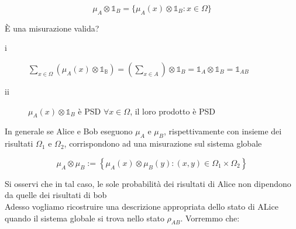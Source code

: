 \documentclass{report}
\begin{document}
$$
    \mu_A\otimes\mathbb{1}_B=\{\mu_A(x)\otimes\mathbb{1}_B:x\in\Omega\}
$$

È una misurazione valida?
\begin{description}
    \item[i]    $\sum_{x\in\Omega}(\mu_A(x)\otimes\mathbb{1_B})=\left(\sum_{x\in A}\right)\otimes\mathbb{1}_B =\mathbb{1}_A\otimes\mathbb{1}_B=\mathbb{1}_{AB}$
    \item[ii]   $\mu_A(x)\otimes\mathbb{1}_B$ è PSD $\forall x \in \Omega$, il loro prodotto è PSD
\end{description}

In generale se Alice e Bob eseguono $\mu_A$ e $\mu_B$, rispettivamente con insieme dei risultati $\Omega_1$ e $\Omega_2$, corrispondono ad una misurazione sul sistema globale

$$
    \mu_A\otimes\mu_B:=\left\{ \mu_A(x)\otimes\mu_B(y) :(x,y)\in \Omega_1 \times\Omega_2 \right\}
$$

Si osservi che in tal caso, le sole probabilità dei risultati di Alice non dipendono da quelle dei risultati di bob
\medskip\\
Adesso vogliamo ricostruire una descrizione appropriata dello stato di ALice quando il sistema globale si trova nello stato $\rho_{AB}$. Vorremmo che:
\end{document}
